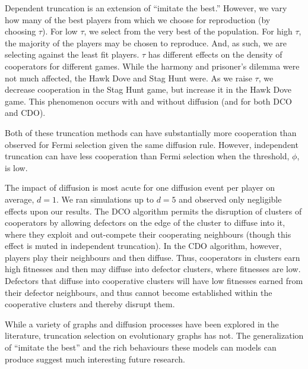 \documentclass[reprint,aps,pre,twocolumn]{revtex4-1}
\begin{document}
Dependent truncation is an extension of ``imitate the best.'' However, we vary how many of the best players from which we choose for reproduction (by choosing $\tau$). For low $\tau$, we select from the very best of the population. For high $\tau$, the majority of the players may be chosen to reproduce. And, as such, we are selecting against the least fit players. $\tau$ has different effects on the density of cooperators for different games. While the harmony and prisoner's dilemma were not much affected, the Hawk Dove and Stag Hunt were. As we raise $\tau$, we decrease cooperation in the Stag Hunt game, but increase it in the Hawk Dove game. This phenomenon occurs with and without diffusion (and for both DCO and CDO).

Both of these truncation methods can have substantially more cooperation than observed for Fermi selection given the same diffusion rule. However, independent truncation can have less cooperation than Fermi selection when the threshold, $\phi$, is low.

The impact of diffusion is most acute for one diffusion event per player on average, $d=1$. We ran simulations up to $d=5$ and observed only negligible effects upon our results. The DCO algorithm permits the disruption of clusters of cooperators by allowing defectors on the edge of the cluster to diffuse into it, where they exploit and out-compete their cooperating neighbours (though this effect is muted in independent truncation). In the CDO algorithm, however, players play their neighbours and then diffuse. Thus, cooperators in clusters earn high fitnesses and then may diffuse into defector clusters, where fitnesses are low. Defectors that diffuse into cooperative clusters will have low fitnesses earned from their defector neighbours, and thus cannot become established within the cooperative clusters and thereby disrupt them.

While a variety of graphs and diffusion processes have been explored in the literature, truncation selection on evolutionary graphs has not. The generalization of ``imitate the best'' and the rich behaviours these models can models can produce suggest much interesting future research.



\end{document}
